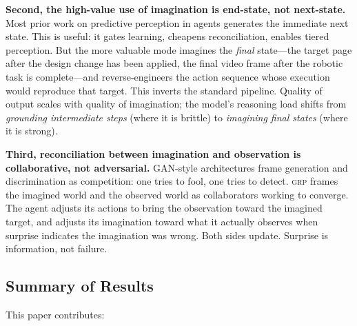 \documentclass[12pt]{article}
\theoremstyle{definition}
\theoremstyle{remark}
\newcommand{\grp}{\textsc{grp}}
\begin{document}
\textbf{Second, the high-value use of imagination is end-state, not
next-state.} Most prior work on predictive perception in agents
generates the immediate next state. This is useful: it gates
learning, cheapens reconciliation, enables tiered perception. But the
more valuable mode imagines the \emph{final} state---the target page
after the design change has been applied, the final video frame after
the robotic task is complete---and reverse-engineers the action
sequence whose execution would reproduce that target. This inverts
the standard pipeline. Quality of output scales with quality of
imagination; the model's reasoning load shifts from \emph{grounding
intermediate steps} (where it is brittle) to \emph{imagining final
states} (where it is strong).

\textbf{Third, reconciliation between imagination and observation is
collaborative, not adversarial.} GAN-style architectures frame
generation and discrimination as competition: one tries to fool, one
tries to detect. \grp{} frames the imagined world and the observed
world as collaborators working to converge. The agent adjusts its
actions to bring the observation toward the imagined target, and
adjusts its imagination toward what it actually observes when surprise
indicates the imagination was wrong. Both sides update. Surprise is
information, not failure.

\subsection{Summary of Results}
\label{subsec:summary}

This paper contributes:
\end{document}
